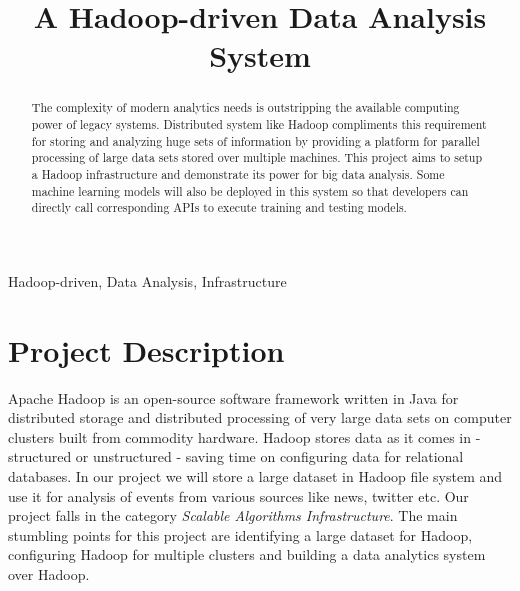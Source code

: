 \documentclass[10pt,conference]{IEEEtran}
\begin{document}
\title{A Hadoop-driven Data Analysis System}

\author{%
\and
{}
\and
{}
}

\maketitle

\begin{abstract}
\textnormal{%
The complexity of modern analytics needs is outstripping the available
computing power of legacy systems. Distributed system like Hadoop compliments
this requirement for storing and analyzing huge sets of information by
providing a platform for parallel processing of large data sets stored over
multiple machines. This project aims to setup a Hadoop infrastructure and
demonstrate its power for big data analysis. Some machine learning models will
also be deployed in this system so that developers can directly call
corresponding APIs to execute training and testing models.
}
\end{abstract}

\begin{IEEEkeywords}
  \textnormal{Hadoop-driven, Data Analysis, Infrastructure}
\end{IEEEkeywords}

\IEEEpeerreviewmaketitle

\section{Project Description}\label{sec:project-description}

Apache Hadoop is an open-source software framework written in Java for
distributed storage and distributed processing of very large data sets on
computer clusters built from commodity hardware. Hadoop stores data as it comes
in - structured or unstructured - saving time on configuring data for
relational databases. In our project we will store a large dataset in Hadoop
file system and use it for analysis of events from various sources like news,
twitter etc. Our project falls in the category \textit{Scalable Algorithms
Infrastructure}. The main stumbling points for this project are identifying a
large dataset for Hadoop, configuring Hadoop for multiple clusters and building
a data analytics system over Hadoop.
\end{document}
